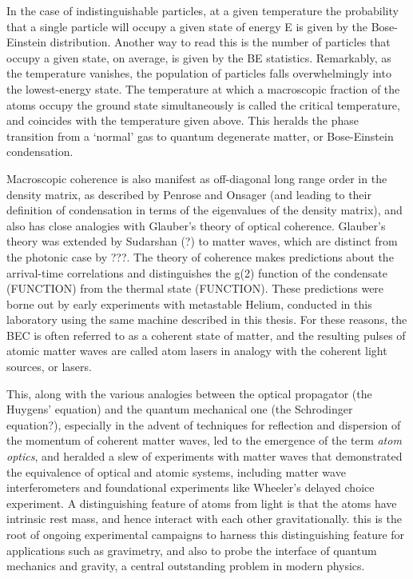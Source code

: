 	In the case of indistinguishable particles, at a given temperature the	probability that a single particle will occupy a given state of energy E	is given by the Bose-Einstein distribution.
	Another way to read this is	the number of particles that occupy a given state, on average, is given	by the BE statistics.
	Remarkably, as the temperature vanishes, the	population of particles falls overwhelmingly into the lowest-energy	state.
	The temperature at which a macroscopic fraction of the atoms	occupy the ground state simultaneously is called the critical	temperature, and coincides with the temperature given above.
	This	heralds the phase transition from a `normal' gas to quantum degenerate	matter, or Bose-Einstein condensation.

	Macroscopic coherence is also manifest as off-diagonal long range order	in the density matrix, as described by Penrose and Onsager (and leading	to their definition of condensation in terms of the eigenvalues of the	density matrix), and also has close analogies with Glauber's theory of	optical coherence.
	Glauber's theory was extended by Sudarshan (?) to	matter waves, which are distinct from the photonic case by ???.
	The	theory of coherence makes predictions about the arrival-time	correlations and distinguishes the g(2) function of the condensate	(FUNCTION) from the thermal state (FUNCTION).
	These predictions were	borne out by early experiments with metastable Helium, conducted in this	laboratory using the same machine described in this thesis.
	For these	reasons, the BEC is often referred to as a coherent state of matter, and	the resulting pulses of atomic matter waves are called atom lasers in	analogy with the coherent light sources, or lasers.

	This, along with the various analogies between the optical propagator	(the Huygens' equation) and the quantum mechanical one (the Schrodinger	equation?), especially in the advent of techniques for reflection and	dispersion of the momentum of coherent matter waves, led to the	emergence of the term \emph{atom optics}, and heralded a slew of	experiments with matter waves that demonstrated the equivalence of	optical and atomic systems, including matter wave interferometers and	foundational experiments like Wheeler's delayed choice experiment.
	A	distinguishing feature of atoms from light is that the atoms have	intrinsic rest mass, and hence interact with each other gravitationally.	this is the root of ongoing experimental campaigns to harness this	distinguishing feature for applications such as gravimetry, and also to	probe the interface of quantum mechanics and gravity, a central	outstanding problem in modern physics.


